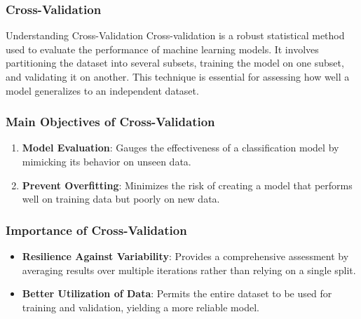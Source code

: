 \documentclass[aspectratio=169]{beamer}
\begin{document}
\begin{frame}[fragile]
    \frametitle{Cross-Validation}
    \begin{block}{Understanding Cross-Validation}
        Cross-validation is a robust statistical method used to evaluate the performance of machine learning models. It involves partitioning the dataset into several subsets, training the model on one subset, and validating it on another. This technique is essential for assessing how well a model generalizes to an independent dataset.
    \end{block}
\end{frame}

\begin{frame}[fragile]
    \frametitle{Main Objectives of Cross-Validation}
    \begin{enumerate}
        \item \textbf{Model Evaluation}: Gauges the effectiveness of a classification model by mimicking its behavior on unseen data.
        \item \textbf{Prevent Overfitting}: Minimizes the risk of creating a model that performs well on training data but poorly on new data.
    \end{enumerate}
\end{frame}

\begin{frame}[fragile]
    \frametitle{Importance of Cross-Validation}
    \begin{itemize}
        \item \textbf{Resilience Against Variability}: Provides a comprehensive assessment by averaging results over multiple iterations rather than relying on a single split.
        \item \textbf{Better Utilization of Data}: Permits the entire dataset to be used for training and validation, yielding a more reliable model.
    \end{itemize}
\end{frame}
\end{document}
